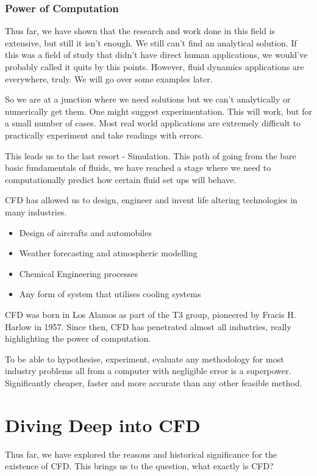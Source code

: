 \documentclass[12pt]{article}
\begin{document}
\subsubsection{Power of Computation}
Thus far, we have shown that the research and work done in this field is extensive, but still it isn't enough. We still can't find an analytical solution. If this was a field of study that didn't have direct human applications, we would've probably called it quits by this points. However, fluid dynamics applications are everywhere, truly. We will go over some examples later.

So we are at a junction where we need solutions but we can't analytically or numerically get them. One might suggest experimentation. This will work, but for a small number of cases. Most real world applications are extremely difficult to practically experiment and take readings with errors.

This leads us to the last resort - Simulation. This path of going from the bare basic fundamentals of fluids, we have reached a stage where we need to computationally predict how certain fluid set ups will behave.

CFD has allowed us to design, engineer and invent life altering technologies in many industries. 

\begin{itemize}
    \item Design of aircrafts and automobiles
    \item Weather forecasting and atmospheric modelling
    \item Chemical Engineering processes
    \item Any form of system that utilises cooling systems
\end{itemize}

CFD was born in Los Alamos as part of the T3 group, pioneered by Fracis H. Harlow in 1957. Since then, CFD has penetrated almost all industries, really highlighting the power of computation.

To be able to hypothesise, experiment, evaluate any methodology for most industry problems all from a computer with negligible error is a superpower. Significantly cheaper, faster and more accurate than any other feasible method.

\section{Diving Deep into CFD }
Thus far, we have explored the reasons and historical significance for the existence of CFD. This brings us to the question, what exactly is CFD? \cite{bib7}\cite{bib8}\cite{bib9}\cite{bib10}
\end{document}
